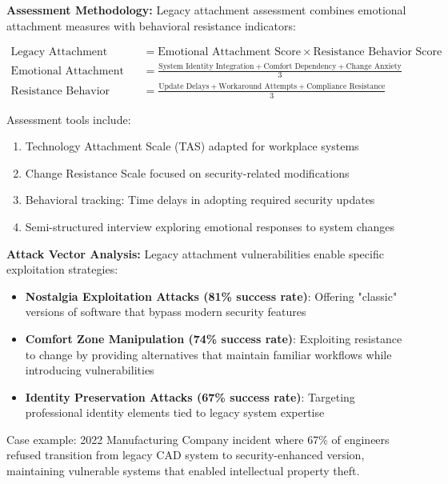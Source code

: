 \documentclass[11pt,a4paper]{article}
\begin{document}
\textbf{Assessment Methodology:}
Legacy attachment assessment combines emotional attachment measures with behavioral resistance indicators:

\begin{align}
\text{Legacy Attachment Index} &= \text{Emotional Attachment Score} \times \text{Resistance Behavior Score} \\
\text{Emotional Attachment Score} &= \frac{\text{System Identity Integration} + \text{Comfort Dependency} + \text{Change Anxiety}}{3} \\
\text{Resistance Behavior Score} &= \frac{\text{Update Delays} + \text{Workaround Attempts} + \text{Compliance Resistance}}{3}
\end{align}

Assessment tools include:
\begin{enumerate}
\item Technology Attachment Scale (TAS) adapted for workplace systems
\item Change Resistance Scale focused on security-related modifications
\item Behavioral tracking: Time delays in adopting required security updates
\item Semi-structured interview exploring emotional responses to system changes
\end{enumerate}

\textbf{Attack Vector Analysis:}
Legacy attachment vulnerabilities enable specific exploitation strategies:
\begin{itemize}
\item \textbf{Nostalgia Exploitation Attacks (81\% success rate)}: Offering "classic" versions of software that bypass modern security features
\item \textbf{Comfort Zone Manipulation (74\% success rate)}: Exploiting resistance to change by providing alternatives that maintain familiar workflows while introducing vulnerabilities
\item \textbf{Identity Preservation Attacks (67\% success rate)}: Targeting professional identity elements tied to legacy system expertise
\end{itemize}

Case example: 2022 Manufacturing Company incident where 67\% of engineers refused transition from legacy CAD system to security-enhanced version, maintaining vulnerable systems that enabled intellectual property theft.
\end{document}
